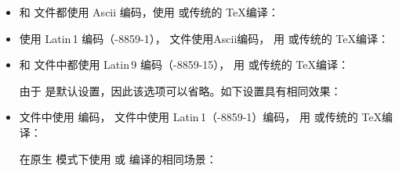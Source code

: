 \begin{itemize}
\setlength{\itemsep}{0pt}

\item
 和  文件都使用 Ascii 编码，使用 \pdfTeX 或传统的 \TeX 编译：

\begin{ltxexample}
\usepackage{biblatex}
\end{ltxexample}

\item
 使用 Latin\,1 编码（-8859-1）， 文件使用Ascii编码，
用 \pdfTeX 或传统的 \TeX 编译：

\begin{ltxexample}
\usepackage[latin1]{inputenc}
\usepackage[bibencoding=ascii]{biblatex}
\end{ltxexample}

\item
 和  文件中都使用 Latin\,9 编码（-8859-15），
用 \pdfTeX 或传统的 \TeX 编译：

\begin{ltxexample}
\usepackage[latin9]{inputenc}
\usepackage[bibencoding=auto]{biblatex}
\end{ltxexample}
%
由于  是默认设置，因此该选项可以省略。如下设置具有相同效果：

\begin{ltxexample}
\usepackage[latin9]{inputenc}
\usepackage{biblatex}
\end{ltxexample}

\item
 文件中使用 \utf 编码， 文件中使用 Latin\,1（-8859-1）编码，
用 \pdfTeX 或传统的 \TeX 编译：

\begin{ltxexample}
\usepackage[utf8]{inputenc}
\usepackage[bibencoding=latin1]{biblatex}
\end{ltxexample}

在原生 \utf 模式下使用 \XeTeX 或 \LuaTeX 编译的相同场景：

\begin{ltxexample}
\usepackage[bibencoding=latin1]{biblatex}
\end{ltxexample}

\end{itemize}

